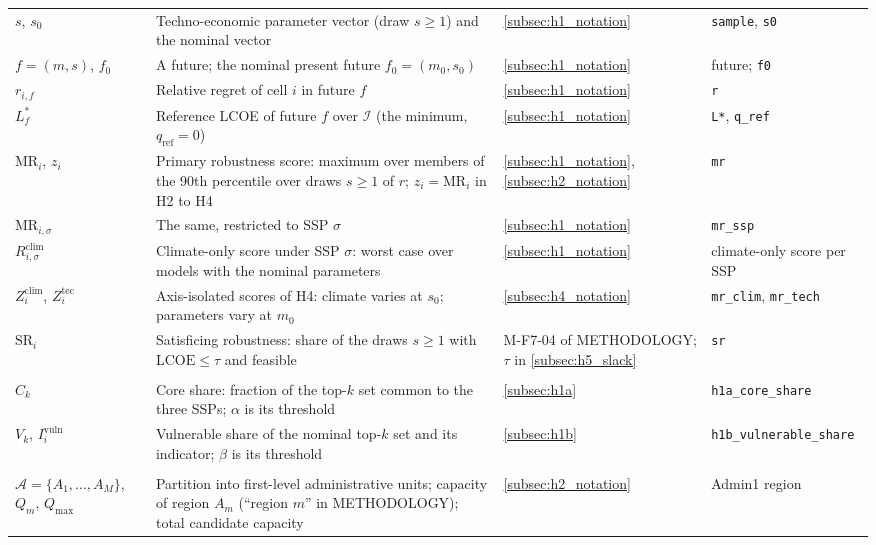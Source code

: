 \begin{longtable}{@{}p{}p{}p{}p{}@{}}
$s$, $s_0$ & Techno-economic parameter vector (draw $s\geq1$) and the nominal vector & \ref{subsec:h1_notation} & \texttt{sample}, \texttt{s0} \\
$f=(m,s)$, $f_0$ & A future; the nominal present future $f_0=(m_0,s_0)$ & \ref{subsec:h1_notation} & future; \texttt{f0} \\
$r_{i,f}$ & Relative regret of cell $i$ in future $f$ & \ref{subsec:h1_notation} & \texttt{r} \\
$L^{*}_{f}$ & Reference LCOE of future $f$ over $\mathcal{I}$ (the minimum, $q_{\mathrm{ref}} = 0$) & \ref{subsec:h1_notation} & \texttt{L*}, \texttt{q\_ref} \\
$\mathrm{MR}_i$, $z_i$ & Primary robustness score: maximum over members of the 90th percentile over draws $s\geq1$ of $r$; $z_i=\mathrm{MR}_i$ in H2 to H4 & \ref{subsec:h1_notation}, \ref{subsec:h2_notation} & \texttt{mr} \\
$\mathrm{MR}_{i,\sigma}$ & The same, restricted to SSP $\sigma$ & \ref{subsec:h1_notation} & \texttt{mr\_ssp} \\
$R^{\mathrm{clim}}_{i,\sigma}$ & Climate-only score under SSP $\sigma$: worst case over models with the nominal parameters & \ref{subsec:h1_notation} & climate-only score per SSP \\
$Z^{\mathrm{clim}}_i$, $Z^{\mathrm{tec}}_i$ & Axis-isolated scores of H4: climate varies at $s_0$; parameters vary at $m_0$ & \ref{subsec:h4_notation} & \texttt{mr\_clim}, \texttt{mr\_tech} \\
$\mathrm{SR}_i$ & Satisficing robustness: share of the draws $s\geq1$ with $\mathrm{LCOE}\leq\tau$ and feasible & M-F7-04 of METHODOLOGY; $\tau$ in \ref{subsec:h5_slack} & \texttt{sr} \\
\addlinespace
\multicolumn{4}{@{}l}{\textit{H1}}\\
$C_k$ & Core share: fraction of the top-$k$ set common to the three SSPs; $\alpha$ is its threshold & \ref{subsec:h1a} & \texttt{h1a\_core\_share} \\
$V_k$, $I^{\mathrm{vuln}}_i$ & Vulnerable share of the nominal top-$k$ set and its indicator; $\beta$ is its threshold & \ref{subsec:h1b} & \texttt{h1b\_vulnerable\_share} \\
\addlinespace
\multicolumn{4}{@{}l}{\textit{H2}}\\
$\mathcal{A}=\{A_1,\dots,A_M\}$, $Q_m$, $Q_{\max}$ & Partition into first-level administrative units; capacity of region $A_m$ (``region $m$'' in METHODOLOGY); total candidate capacity & \ref{subsec:h2_notation} & Admin1 region \\

\end{longtable}
